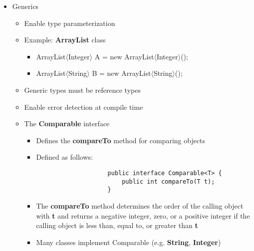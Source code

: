 \begin{itemize}
	\item Generics
	\begin{itemize}
		\item Enable type parameterization
		\item Example: \textbf{ArrayList} class
		\begin{itemize}
			\item ArrayList$\langle$Integer$\rangle$ A = new ArrayList$\langle$Integer$\rangle$();
			\item ArrayList$\langle$String$\rangle$ B = new ArrayList$\langle$String$\rangle$();
		\end{itemize}
		\item Generic types must be reference types
		\item Enable error detection at compile time
		\item The \textbf{Comparable} interface
		\begin{itemize}
			\item Defines the \textbf{compareTo} method for comparing objects
			\item Defined as follows:\\[5pt]
			\begin{minipage}{0.5\textwidth}
				\begin{Verbatim}
					public interface Comparable<T> {
						public int compareTo(T t);
					}
				\end{Verbatim}
			\end{minipage}
			\item The \textbf{compareTo} method determines the order of the calling object with \textbf{t} and returns a negative integer, zero, or a positive integer if the calling object is less than, equal to, or greater than \textbf{t}
			\item Many classes implement Comparable (e.g. \textbf{String}, \textbf{Integer})

\end{itemize}
\end{itemize}
\end{itemize}

